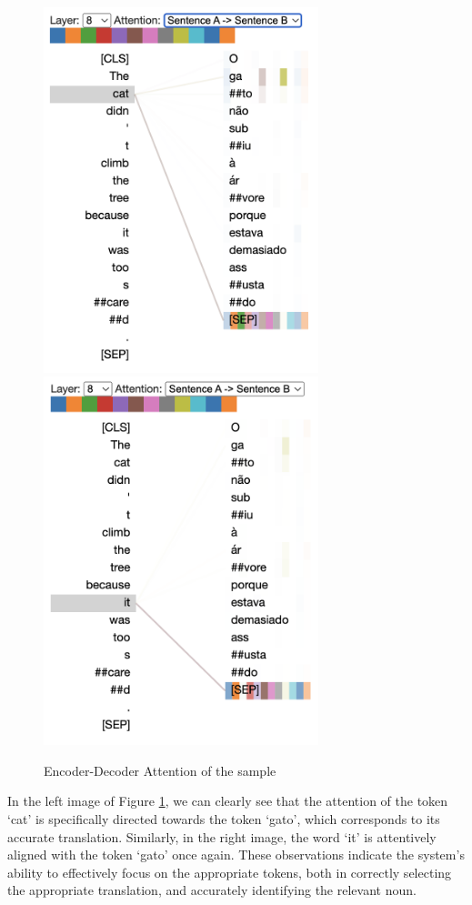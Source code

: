\begin{figure}[h]
    \centering
    \includegraphics[width=8cm]{pages/imgs/att_cat_sample.png}
    \includegraphics[width=8cm]{pages/imgs/att_it_sample.png}
    \caption{Encoder-Decoder Attention of the sample}
    \label{fig:ed_att_sample}
\end{figure}

In the left image of Figure \ref{fig:ed_att_sample}, we can clearly see that the attention of the token `cat' is specifically directed towards the token `gato', which corresponds to its accurate translation. Similarly, in the right image, the word `it' is attentively aligned with the token `gato' once again. These observations indicate the system's ability to effectively focus on the appropriate tokens, both in correctly selecting the appropriate translation, and accurately identifying the relevant noun.

